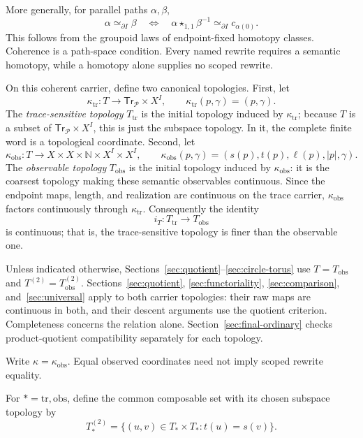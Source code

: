 \documentclass[10pt,reqno]{amsart}
\theoremstyle{definition}
\theoremstyle{plain}
\theoremstyle{remark}
\newcommand{\N}{\mathbb N}
\begin{document}
More generally, for parallel paths $\alpha,\beta$,
\[
 \alpha\simeq_{\partial I}\beta
 \quad\Longleftrightarrow\quad
 \alpha\star_{1,1}\beta^{-1}\simeq_{\partial I}c_{\alpha(0)}.
\]
This follows from the groupoid laws of endpoint-fixed homotopy classes.
Coherence is a path-space condition. Every named rewrite requires a
semantic homotopy, while a homotopy alone supplies no scoped rewrite.

On this coherent carrier, define two canonical topologies. First, let
\[
  \kappa_{\mathrm{tr}}:T\longrightarrow
    \mathsf{Tr}_{\mathcal P}\times X^I,
  \qquad
  \kappa_{\mathrm{tr}}(p,\gamma)=(p,\gamma).
\]
The \emph{trace-sensitive topology} $T_{\mathrm{tr}}$ is the initial topology
induced by $\kappa_{\mathrm{tr}}$; because $T$ is a subset of
$\mathsf{Tr}_{\mathcal P}\times X^I$, this is just the subspace topology.
In it, the complete finite word is a topological coordinate.  Second, let
\[
  \kappa_{\mathrm{obs}}:T\longrightarrow X\times X\times\N\times X^I\times X^I,
  \qquad
  \kappa_{\mathrm{obs}}(p,\gamma)=(s(p),t(p),\ell(p),|p|,\gamma).
\]
The \emph{observable topology} $T_{\mathrm{obs}}$ is the initial topology
induced by $\kappa_{\mathrm{obs}}$:
it is the coarsest topology making these semantic observables continuous.
Since the endpoint maps, length, and realization are continuous on the trace
carrier, $\kappa_{\mathrm{obs}}$ factors continuously through
$\kappa_{\mathrm{tr}}$.  Consequently the identity
\[
  i_T:T_{\mathrm{tr}}\longrightarrow T_{\mathrm{obs}}
\]
is continuous; that is, the trace-sensitive topology is finer than the
observable one.

Unless indicated otherwise, Sections~\ref{sec:quotient}--\ref{sec:circle-torus}
use $T=T_{\mathrm{obs}}$ and $T^{(2)}=T_{\mathrm{obs}}^{(2)}$.
Sections~\ref{sec:quotient}, \ref{sec:functoriality}, \ref{sec:comparison},
and~\ref{sec:universal} apply to both carrier topologies: their raw maps
are continuous in both, and their descent arguments use the quotient criterion.
Completeness concerns the relation alone. Section~\ref{sec:final-ordinary}
checks product-quotient compatibility separately for each topology.

Write $\kappa=\kappa_{\mathrm{obs}}$. Equal observed coordinates need not
imply scoped rewrite equality.

For $*=\mathrm{tr},\mathrm{obs}$, define the common composable set with its
chosen subspace topology by
\[
  T_*^{(2)}=\{(u,v)\in T_*\times T_*:t(u)=s(v)\}.
\]
\end{document}
